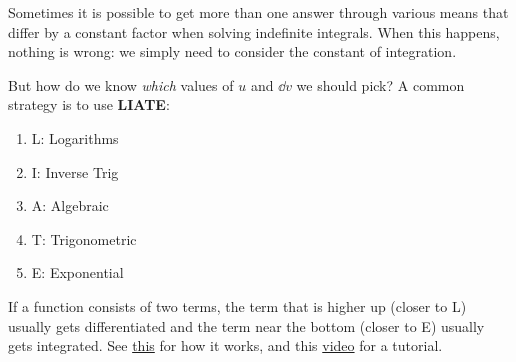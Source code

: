 \begin{itemize}
\begin{example}
    \end{example}
    \begin{warning}
        Sometimes it is possible to get more than one answer through various means that differ by a constant factor when solving indefinite integrals. When this happens, nothing is wrong: we simply need to consider the constant of integration.
    \end{warning}
    \begin{idea}
        But how do we know \textit{which} values of $u$ and $\dd{v}$ we should pick? A common strategy is to use \textbf{LIATE}:
        \begin{enumerate}
            \item L: Logarithms
            \item I: Inverse Trig
            \item A: Algebraic
            \item T: Trigonometric
            \item E: Exponential
        \end{enumerate}
        If a function consists of two terms, the term that is higher up (closer to L) usually gets differentiated and the term near the bottom (closer to E) usually gets integrated. See \href{https://math.stackexchange.com/questions/768332/liate-how-does-it-work}{this} for how it works, and this \href{https://www.youtube.com/watch?v=fnHxq8ZK0rE}{video} for a tutorial.
    \end{idea}
\end{itemize}
